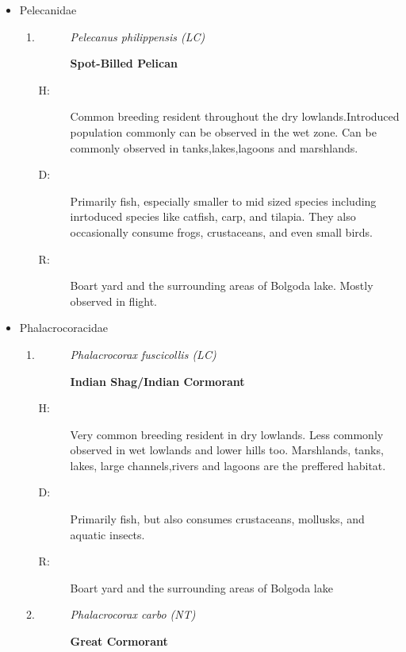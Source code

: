 \begin{itemize}
\item%
Pelecanidae%
\begin{enumerate}%
\item%
\begin{description}%
\item[]%
\textit{Pelecanus philippensis (LC)}%
\item[]%
\textbf{Spot{-}Billed Pelican}%
\end{description}%
\begin{description}%
\item[H: ]%
Common breeding resident throughout the dry lowlands.Introduced population commonly can be observed in the wet zone.  Can be commonly observed in tanks,lakes,lagoons and marshlands.%
\item[D: ]%
Primarily fish, especially smaller to mid sized species including inrtoduced species like catfish, carp, and tilapia. They also occasionally consume frogs, crustaceans, and even small birds.%
\item[R: ]%
Boart yard and the surrounding areas of Bolgoda lake. Mostly observed in flight.%
\end{description}%
\end{enumerate}%
\item%
Phalacrocoracidae%
\begin{enumerate}%
\item%
\begin{description}%
\item[]%
\textit{Phalacrocorax fuscicollis (LC)}%
\item[]%
\textbf{Indian Shag/Indian Cormorant}%
\end{description}%
\begin{description}%
\item[H: ]%
Very common breeding resident in dry lowlands. Less commonly observed in wet lowlands and lower hills too. Marshlands, tanks, lakes, large channels,rivers and lagoons are the preffered habitat.%
\item[D: ]%
Primarily fish, but also consumes crustaceans, mollusks, and aquatic insects.%
\item[R: ]%
Boart yard and the surrounding areas of Bolgoda lake%
\end{description}%
\item%
\begin{description}%
\item[]%
\textit{Phalacrocorax carbo (NT)}%
\item[]%
\textbf{Great Cormorant}%
\end{description}%

\end{enumerate}
\end{itemize}
